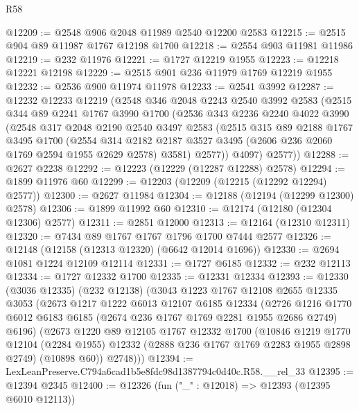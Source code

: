 \begin{lexlean}{R58}
\begin{coremodule}
@12209 := @2548 @906 @2048 @11989 @2540 @12200 @2583
@12215 := @2515 @904 @89 @11987 @1767 @12198 @1700
@12218 := @2554 @903 @11981 @11986
@12219 := @232 @11976
@12221 := @1727 @12219 @1955
@12223 := @12218 @12221 @12198
@12229 := @2515 @901 @236 @11979 @1769 @12219 @1955
@12232 := @2536 @900 @11974 @11978
@12233 := @2541 @3992
@12287 := @12232
    @12233
    @12219
    (@2548
      @346
      @2048
      @2243
      @2540
      @3992
      @2583
      (@2515
        @344
        @89
        @2241
        @1767
        @3990
        @1700
        (@2536
          @343
          @2236
          @2240
          @4022
          @3990
          (@2548
            @317
            @2048
            @2190
            @2540
            @3497
            @2583
            (@2515
              @315
              @89
              @2188
              @1767
              @3495
              @1700
              (@2554
                @314
                @2182
                @2187
                @3527
                @3495
                (@2606 @236 @2060 @1769 @2594 @1955 @2629 @2578)
                @3581)
              @2577))
          @4097)
        @2577))
@12288 := @2627 @2238
@12292 := @12223 (@12229 (@12287 @12288) @2578)
@12294 := @1899 @11976 @60
@12299 := @12203 (@12209 (@12215 (@12292 @12294) @2577))
@12300 := @2627 @11984
@12304 := @12188 (@12194 (@12299 @12300) @2578)
@12306 := @1899 @11992 @60
@12310 := @12174 (@12180 (@12304 @12306) @2577)
@12311 := @2851 @12000
@12313 := @12164 (@12310 @12311)
@12320 := @7434 @89 @1767 @1767 @1796 @1700 @7444 @2577
@12326 := @12148 (@12158 (@12313 @12320) (@6642 @12014 @1696))
@12330 := @2694 @1081 @1224 @12109 @12114
@12331 := @1727 @6185
@12332 := @232 @12113
@12334 := @1727 @12332 @1700
@12335 := @12331 @12334
@12393 := @12330
    (@3036 @12335)
    (@232 @12138)
    (@3043
      @1223
      @1767
      @12108
      @2655
      @12335
      @3053
      (@2673
        @1217
        @1222
        @6013
        @12107
        @6185
        @12334
        (@2726 @1216 @1770 @6012 @6183 @6185 (@2674 @236 @1767 @1769 @2281 @1955 @2686 @2749) @6196)
        (@2673
          @1220
          @89
          @12105
          @1767
          @12332
          @1700
          (@10846
            @1219
            @1770
            @12104
            (@2284 @1955)
            @12332
            (@2888 @236 @1767 @1769 @2283 @1955 @2898 @2749)
            (@10898 @60))
          @2748)))
@12394 := LexLeanPreserve.C794a6cad1b5e8fdc98d1387794c0d40c.R58.__rel_33
@12395 := @12394 @2345
@12400 := @12326 (fun ("_" : @12018) => @12393 (@12395 @6010 @12113))

\end{coremodule}
\end{lexlean}
